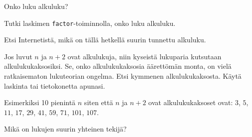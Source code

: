 \begin{kotitehtavasivu}
\begin{tehtava}
\end{tehtava}

\begin{tehtava}
    Onko luku
    alkuluku?
    
    \begin{vastaus}
    \end{vastaus}
    
\end{tehtava}

\begin{tehtava}
    Tutki laskimen {\tt factor}-toiminnolla, onko luku
    alkuluku.

    \begin{vastaus}
    \end{vastaus}
    
\end{tehtava}

\begin{tehtava}
    Etsi Internetistä, mikä on tällä hetkellä suurin tunnettu alkuluku.
\end{tehtava}

\begin{tehtava}
    Jos luvut $n$ ja $n + 2$ ovat alkulukuja, niin kyseistä lukuparia kutsutaan alkulukukaksosiksi. Se, onko alkulukukaksosia äärettömän monta, on vielä ratkaisematon lukuteorian ongelma. Etsi kymmenen alkulukukaksosta. Käytä laskinta tai tietokonetta apunasi.
    
    \begin{vastaus}
        Esimerkiksi 10 pienintä $n$ siten että $n$ ja $n + 2$ ovat alkulukukaksoset ovat: $3$, $5$, $11$, $17$, $29$, $41$, $59$, $71$, $101$, $107$.
    \end{vastaus}
    
\end{tehtava}

\begin{tehtava}
    Mikä on lukujen suurin yhteinen tekijä?


\end{tehtava}
\end{kotitehtavasivu}
